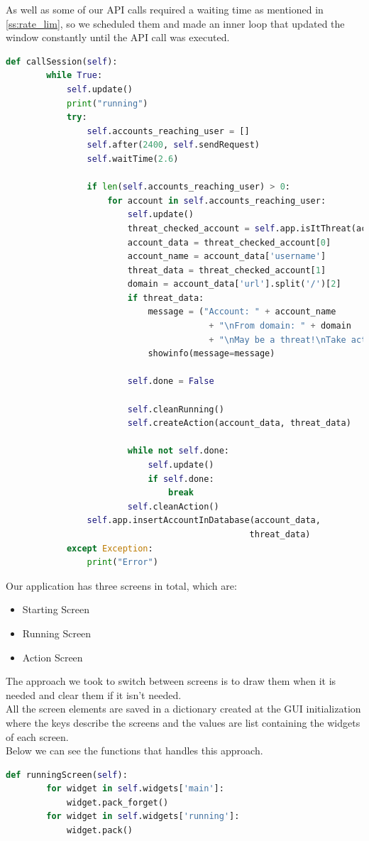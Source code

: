 As well as some of our API calls required a waiting time as mentioned in \ref{ss:rate_lim},
so we scheduled them and made an inner loop that updated the window constantly until the API call was executed.
\\[5pt]
\begin{lstlisting}[language=python, caption={Updating the window while calling API functions}, captionpos=b]
	def callSession(self):
		while True:
			self.update()
			print("running")
			try:
				self.accounts_reaching_user = []
				self.after(2400, self.sendRequest)
				self.waitTime(2.6)
				
				if len(self.accounts_reaching_user) > 0:
					for account in self.accounts_reaching_user:
						self.update()
						threat_checked_account = self.app.isItThreat(account)
						account_data = threat_checked_account[0]
						account_name = account_data['username']
						threat_data = threat_checked_account[1]
						domain = account_data['url'].split('/')[2]
						if threat_data:
							message = ("Account: " + account_name
										+ "\nFrom domain: " + domain 
										+ "\nMay be a threat!\nTake action!")
							showinfo(message=message)
				
						self.done = False
				
						self.cleanRunning() 
						self.createAction(account_data, threat_data)
	 		
						while not self.done:
							self.update()
							if self.done:
								break
						self.cleanAction()
				self.app.insertAccountInDatabase(account_data, 
												threat_data)
			except Exception:
				print("Error")
\end{lstlisting}
Our application has three screens in total, which are:
\begin{itemize}
	\item Starting Screen
	\item Running Screen
	\item Action Screen
\end{itemize}
The approach we took to switch between screens is to draw them when it is needed and
clear them if it isn't needed.
\\[5pt]
All the screen elements are saved in a dictionary created at the GUI initialization where the keys
describe the screens and the values are list containing the widgets of each screen.
\\[5pt]
Below we can see the functions that handles this approach.
\\[5pt]
\begin{lstlisting}[language=python, caption={Switching from starting screen to running screen}, captionpos=b]
	def runningScreen(self):
		for widget in self.widgets['main']:
			widget.pack_forget()
		for widget in self.widgets['running']:
			widget.pack()
\end{lstlisting}
